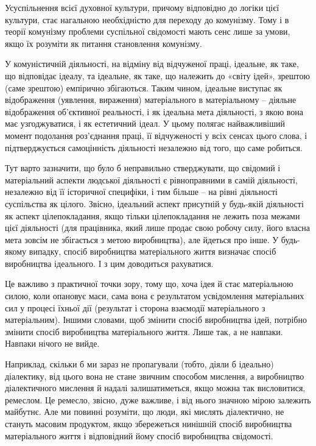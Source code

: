 \documentclass[12pt,a4paper,openany]{book}
\begin{document}
Усуспільнення всієї духовної культури, причому відповідно до логіки цієї культури, стає нагальною необхідністю для переходу до комунізму. Тому і в теорії комунізму проблеми суспільної свідомості мають сенс лише за умови, якщо їх розуміти як питання становлення комунізму.

У комуністичній діяльності, на відміну від відчуженої праці, ідеальне, як таке, що відповідає ідеалу, та ідеальне, як таке, що належить до «світу ідей», зрештою (саме зрештою) емпірично збігаються. Таким чином, ідеальне виступає як відображення (уявлення, вираження) матеріального в матеріальному – діяльне відображення об’єктивної реальності, і як ідеальна мета діяльності, з якою вона має узгоджуватися, і як естетичний ідеал. У цьому полягає найважливіший момент подолання роз’єднання праці, її відчуженості у всіх сенсах цього слова, і підтверджується самоцінність діяльності незалежно від того, що саме робиться.

Тут варто зазначити, що було б неправильно стверджувати, що свідомий і матеріальний аспекти людської діяльності є рівноправними в самій діяльності, незалежно від її історичної специфіки, і тим більше – на рівні діяльності суспільства як цілого. Звісно, ідеальний аспект присутній у будь-якій діяльності як аспект цілепокладання, якщо тільки цілепокладання не лежить поза межами цієї діяльності (для працівника, який лише продає свою робочу силу, його власна мета зовсім не збігається з метою виробництва), але йдеться про інше. У будь-якому випадку, спосіб виробництва матеріального життя визначає спосіб виробництва ідеального. І з цим доводиться рахуватися.

Це важливо з практичної точки зору, тому що, хоча ідея й стає матеріальною силою, коли опановує маси, сама вона є результатом усвідомлення матеріальних сил у процесі їхньої дії (результат і сторона взаємодії матеріального з матеріальним). Іншими словами, щоб змінити спосіб виробництва ідей, потрібно змінити спосіб виробництва матеріального життя. Лише так, а не навпаки. Навпаки нічого не вийде.

Наприклад, скільки б ми зараз не пропагували (тобто, діяли б ідеально) діалектику, від цього вона не стане звичним способом мислення, а виробництво діалектичного мислення й надалі залишатиметься, якщо можна так висловитися, ремеслом. Це ремесло, звісно, дуже важливе, і від нього значною мірою залежить майбутнє. Але ми повинні розуміти, що люди, які мислять діалектично, не стануть масовим продуктом, якщо збережеться нинішній спосіб виробництва матеріального життя і відповідний йому спосіб виробництва свідомості.
\end{document}
